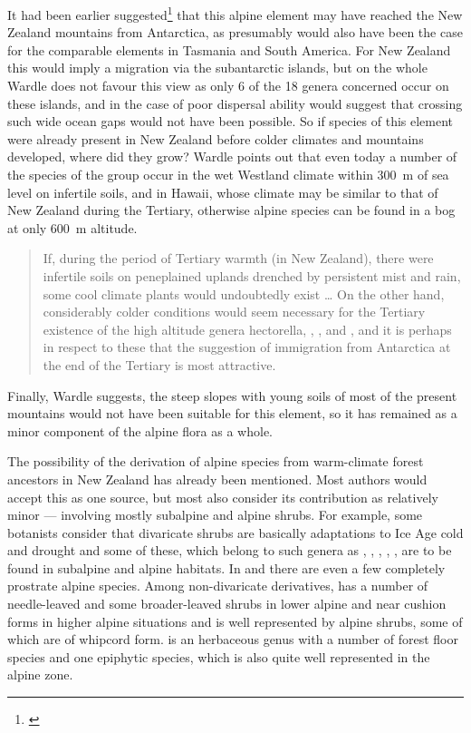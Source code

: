 It had been earlier suggested\footnote{\cite{fleming1963age}} that this alpine element may have reached the New Zealand mountains from Antarctica, as presumably would also have been the case for the comparable elements in Tasmania and South America.
For New Zealand this would imply a migration via the subantarctic islands, but on the whole Wardle does not favour this view as only 6 of the 18 genera concerned occur on these islands, and in the case of  poor dispersal ability would suggest that crossing such wide ocean gaps would not have been possible.
So if species of this element were already present in New Zealand before colder climates and mountains developed, where did they grow? Wardle points out that even today a number of the species of the group occur in the wet Westland climate within \SI{300}{\metre} of sea level on infertile soils, and in Hawai{\okina}i, whose climate may be similar to that of New Zealand during the Tertiary, otherwise alpine species can be found in a bog at only \SI{600}{\metre} altitude.

\begin{quote}
	If, during the period of Tertiary warmth (in New Zealand), there were infertile soils on peneplained uplands drenched by persistent mist and rain, some cool climate plants would undoubtedly exist … On the other hand, considerably colder conditions would seem necessary for the Tertiary existence of the high altitude genera hectorella, , ,  and , and it is perhaps in respect to these that the suggestion of immigration from Antarctica at the end of the Tertiary is most attractive.
\end{quote}

Finally, Wardle suggests, the steep slopes with young soils of most of the present mountains would not have been suitable for this element, so it has remained as a minor component of the alpine flora as a whole.

The possibility of the derivation of alpine species from warm-climate forest ancestors in New Zealand has already been mentioned.
Most authors would accept this as one source, but most also consider its contribution as relatively minor --- involving mostly subalpine and alpine shrubs.
For example, some botanists consider that divaricate shrubs are basically adaptations to Ice Age cold and drought and some of these, which belong to such genera as , , , , , are to be found in subalpine and alpine habitats.
In  and  there are even a few completely prostrate alpine species.
Among non-divaricate derivatives,  has a number of needle-leaved and some broader-leaved shrubs in lower alpine and near cushion forms in higher alpine situations and  is well represented by alpine shrubs, some of which are of whipcord form.  is an herbaceous genus with a number of forest floor species and one epiphytic species, which is also quite well represented in the alpine zone.

